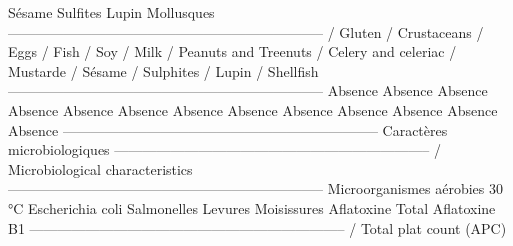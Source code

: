 \newline Sésame \newline Sulfites \newline Lupin \newline Mollusques \newline -------------------------------------------------------------------- \newline / Gluten \newline / Crustaceans \newline / Eggs \newline / Fish \newline / Soy \newline / Milk \newline / Peanuts and Treenuts \newline / Celery and celeriac \newline / Mustarde \newline / Sésame \newline / Sulphites \newline / Lupin \newline / Shellfish \newline -------------------------------------------------------------------- \newline Absence \newline Absence \newline Absence \newline Absence \newline Absence \newline Absence \newline Absence \newline Absence \newline Absence \newline Absence \newline Absence \newline Absence \newline Absence \newline -------------------------------------------------------------------- \newline Caractères microbiologiques \newline -------------------------------------------------------------------- \newline / Microbiological characteristics \newline -------------------------------------------------------------------- \newline Microorganismes aérobies 30 °C \newline Escherichia coli  \newline Salmonelles \newline Levures \newline Moisissures \newline Aflatoxine Total \newline Aflatoxine B1 \newline -------------------------------------------------------------------- \newline / Total plat count (APC) 